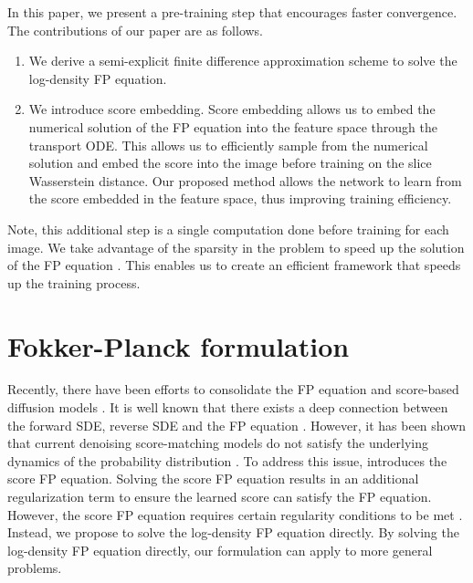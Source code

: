 \documentclass[]{interact}
\theoremstyle{plain}%
\theoremstyle{definition}
\theoremstyle{remark}
\begin{document}
In this paper, we present a pre-training step that encourages faster convergence. The contributions of our paper are as follows.
\begin{enumerate}
    \item We derive a semi-explicit finite difference approximation scheme to solve the log-density FP equation.
    \item We introduce score embedding. Score embedding allows us to embed the numerical solution of the FP equation into the feature space through the transport ODE. This allows us to efficiently sample from the numerical solution and embed the score into the image before training on the slice Wasserstein distance. Our proposed method allows the network to learn from the score embedded in the feature space, thus improving training efficiency. 
\end{enumerate}
Note, this additional step is a single computation done before training for each image. We take advantage of the sparsity in the problem to speed up the solution of the FP equation \cite{saad-2003}. This enables us to create an efficient framework that speeds up the training process.

\section{Fokker-Planck formulation} 
Recently, there have been efforts to consolidate the FP equation and score-based diffusion models \cite{lai-2022}. It is well known that there exists a deep connection between the forward SDE, reverse SDE and the FP equation \cite{anderson-1982, oksendal-1987}. However, it has been shown that current denoising score-matching models do not satisfy the underlying dynamics of the probability distribution \cite{lai-2022}. To address this issue, \cite{lai-2022} introduces the score FP equation. Solving the score FP equation results in an additional regularization term to ensure the learned score can satisfy the FP equation. However, the score FP equation requires certain regularity conditions to be met \cite{lai-2022}. Instead, we propose to solve the log-density FP equation directly. By solving the log-density FP equation directly, our formulation can apply to more general problems.
\end{document}
